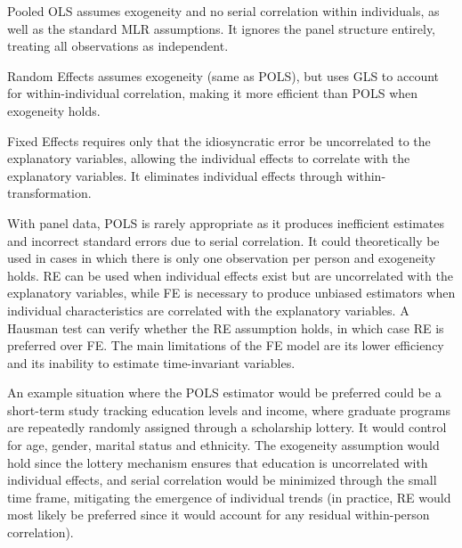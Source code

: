 


Pooled OLS assumes exogeneity and no serial correlation within individuals, as well as the standard MLR assumptions. It ignores the panel structure entirely, treating all observations as independent.

Random Effects assumes exogeneity (same as POLS), but uses GLS to account for within-individual correlation, making it more efficient than POLS when exogeneity holds.

Fixed Effects requires only that the idiosyncratic error be uncorrelated to the explanatory variables, allowing the individual effects to correlate with the explanatory variables. It eliminates individual effects through within-transformation.

With panel data, POLS is rarely appropriate as it produces inefficient estimates and incorrect standard errors due to serial correlation. It could theoretically be used in cases in which there is only one observation per person and exogeneity holds. RE can be used when individual effects exist but are uncorrelated with the explanatory variables, while FE is necessary to produce unbiased estimators when individual characteristics are correlated with the explanatory variables. A Hausman test can verify whether the RE assumption holds, in which case RE is preferred over FE. The main limitations of the FE model are its lower efficiency and its inability to estimate time-invariant variables.

\newpage


An example situation where the POLS estimator would be preferred could be a short-term study tracking education levels and income, where graduate programs are repeatedly randomly assigned through a scholarship lottery. It would control for age, gender, marital status and ethnicity. The exogeneity assumption would hold since the lottery mechanism ensures that education is uncorrelated with individual effects, and serial correlation would be minimized through the small time frame, mitigating the emergence of individual trends (in practice, RE would most likely be preferred since it would account for any residual within-person correlation).


